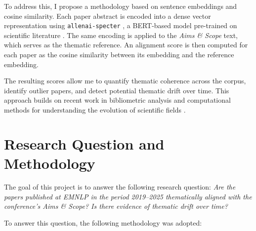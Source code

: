 \documentclass[pdflatex,sn-mathphys-num]{sn-jnl}%
\theoremstyle{thmstyleone}%
\theoremstyle{thmstyletwo}%
\theoremstyle{thmstylethree}%
\begin{document}
To address this, I propose a methodology based on sentence embeddings 
and cosine similarity. Each paper abstract is encoded into a dense 
vector representation using \texttt{allenai-specter} \cite{specter2020}, 
a BERT-based model pre-trained on scientific literature \cite{reimers2019}. 
The same encoding is applied to the \textit{Aims \& Scope} text, which 
serves as the thematic reference. An alignment score is then computed 
for each paper as the cosine similarity between its embedding and the 
reference embedding.

The resulting scores allow me to quantify thematic coherence across 
the corpus, identify outlier papers, and detect potential thematic 
drift over time. This approach builds on recent work in bibliometric 
analysis and computational methods for understanding the evolution of 
scientific fields \cite{picascia2025, hassan2014}.

\section{Research Question and Methodology}\label{sec2}

The goal of this project is to answer the following research question: 
\textit{Are the papers published at EMNLP in the period 2019--2025 
thematically aligned with the conference's Aims \& Scope? Is there 
evidence of thematic drift over time?}

To answer this question, the following methodology was adopted:
\end{document}
